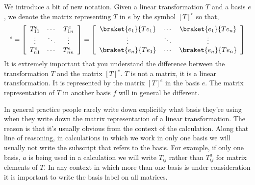 We introduce a bit of new notation.  Given a linear transformation $T$ and a basis $e$, we denote the matrix representing $T$ in $e$ by the symbol $[T]^e$ so that,
\begin{displaymath} [T]^e = 
\left[ \begin{array}{ccc} T_{11}^e & \cdots & T_{1n}^e \\ \vdots & \ddots & \vdots \\ T_{n1}^e & \cdots & T_{nn}^e \end{array} \right] = 
\left[ \begin{array}{ccc} \braket{e_1}{Te_1} & \cdots & \braket{e_1}{Te_n} \\ \vdots & \ddots & \vdots \\ \braket{e_n}{Te_1} & \cdots & \braket{e_n}{Te_n} \end{array} \right]
\end{displaymath}
It is extremely important that you understand the difference between the transformation $T$ and the matrix $[T]^e$.  $T$ is not a matrix, it is a linear transformation.  It is represented by the matrix $[T]^e$ in the basis $e$.  The matrix representation of $T$ in another basis $f$ will in general be different.

In general practice people rarely write down explicitly what basis they're using when they write down the matrix representation of a linear transformation. The reason is that it's usually obvious from the context of the calculation. Along that line of reasoning, in calculations in which we work in only one basis we will usually not write the subscript that refers to the basis.  For example, if only one basis, $a$ is being used in a calculation we will write $T_{ij}$ rather than $T^a_{ij}$ for matrix elements of $T$. In any context in which more than one basis is under consideration it is important to write the basis label on all matrices.

